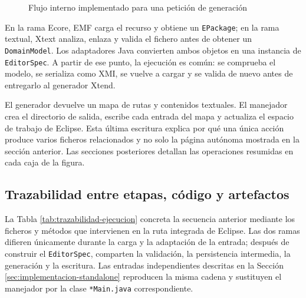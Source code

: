 \begin{figure}[htbp]
{%
  }
  \caption{Flujo interno implementado para una petición de generación}
  \label{fig:flujo-interno-ejecucion}
\end{figure}

En la rama Ecore, EMF carga el recurso y obtiene un \texttt{EPackage}; en la
rama textual, Xtext analiza, enlaza y valida el fichero antes de obtener un
\texttt{DomainModel}. Los adaptadores Java convierten ambos objetos en una
instancia de \texttt{EditorSpec}. A partir de ese punto, la ejecución es común:
se comprueba el modelo, se serializa como XMI, se vuelve a cargar y se valida de
nuevo antes de entregarlo al generador Xtend.

El generador devuelve un mapa de rutas y contenidos textuales. El manejador crea
el directorio de salida, escribe cada entrada del mapa y actualiza el espacio de trabajo
de Eclipse. Esta última escritura explica por qué una única acción produce varios
ficheros relacionados y no solo la página autónoma mostrada en la sección
anterior. Las secciones posteriores detallan las operaciones resumidas en cada
caja de la figura.

\subsection{Trazabilidad entre etapas, código y artefactos}

La Tabla \ref{tab:trazabilidad-ejecucion} concreta la secuencia anterior mediante
los ficheros y métodos que intervienen en la ruta integrada de Eclipse. Las dos
ramas difieren únicamente durante la carga y la adaptación de la entrada; después
de construir el \texttt{EditorSpec}, comparten la validación, la persistencia
intermedia, la generación y la escritura. Las entradas independientes descritas
en la Sección \ref{sec:implementacion-standalone} reproducen la misma cadena y
sustituyen el manejador por la clase \texttt{*Main.java} correspondiente.

